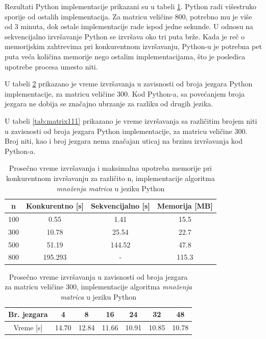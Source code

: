 \documentclass[12pt,oneside]{memoir}
\begin{document}
Rezultati Python implementacije prikazani su u tabeli \ref{tab:matrix1}. Python radi višestruko sporije od ostalih implementacija. Za matricu veličine 800, potrebno mu je više od 3 minuta, dok ostale implementacije rade ispod jedne sekunde. U odnosu na sekvencijalno izvršavanje Python se izvršava oko tri puta brže. Kada je reč o memorijskim zahtrevima pri konkurentnom izvršavanju, Python-u je potrebna pet puta veća količina memorije nego ostalim implementacijama, što je posledica upotrebe procesa umesto niti.

U  tabeli \ref{tab:matrix11} prikazano je vreme izvršavanja u zavisnosti od broja jezgara Python implementacije, za matricu veličine 300. Kod Python-a, sa povećanjem broja jezgara ne dobija se značajno ubrzanje za razliku od drugih jezika. 

U  tabeli \ref{tab:matrix111} prikazano je vreme izvršavanja sa različitim brojem niti u zavisnosti od broja jezgara Python implementacije, za matricu veličine 300. Broj niti, kao i broj jezgara  nema značajan uticaj na brzinu izvršavanja kod Python-a.

\begin{table}
\begin{center}
\caption{Prosečno vreme izvršavanja i maksimalna upotreba memorije pri konkurentnom izvršavanju za različito n,  implementacije  algoritma \textit{množenja matrica}  u jeziku Python}
\begin{tabular}{||c||c|c|c||}
\hline
n & Konkurentno [s]& Sekvencijalno [s] & Memorija [MB] \\ \hline
100	&0.55		&1.41		&15.5\\
300	&10.78	&25.54	&22.7\\
500	&51.19	&144.52	&47.8\\
800	&195.293	&- 		&115.3\\
\hline
\end{tabular}
\label{tab:matrix1}
\end{center}
\end{table}

\begin{table}
\begin{center}
\caption{Prosečno vreme izvršavanja u zavisnosti od broja jezgara za matricu veličine 300, implementacije algoritma \textit{množenja matrica} u jeziku Python}
\begin{tabular}{||c||c|c|c|c|c|c||}
\hline
Br. jezgara &4  &8 &16 &24 & 32 &48 \\ \hline
Vreme [s]	&14.70	&12.84	&11.66 	& 10.91	&10.85	&10.78\\ \hline  
\end{tabular}
\label{tab:matrix11}
\end{center}
\end{table}
\end{document}
